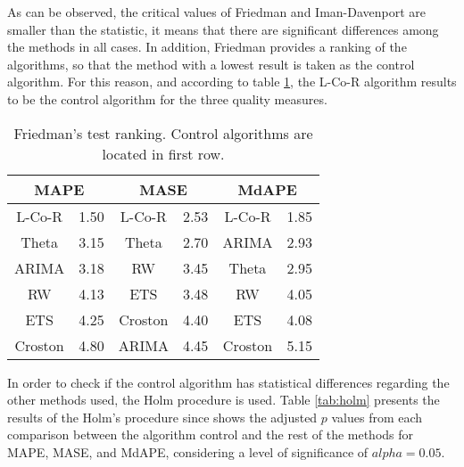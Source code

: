 \documentclass[a4paper,twoside]{article}
\newcommand{\metodo}{L-Co-R}
\begin{document}
    As can be observed, the critical values of Friedman and Iman-Davenport are smaller than the statistic, it means that there are significant differences among the methods in all cases.
    In addition, Friedman provides a ranking of the algorithms, so that the method with a lowest result is taken as the control algorithm. For this reason, and according to table \ref{tab:ranking}, the {\metodo} algorithm results to be the control algorithm for the three quality measures.

    \begin{table}[h]
        \caption{Friedman's test ranking. Control algorithms are located in first row.}
        \label{tab:ranking}
        \centering
        \begin{tabular}{|c|c|c|c|c|c|}
         \hline \multicolumn{2}{|c|}{MAPE}   &  \multicolumn{2}{c|}{MASE}  &   \multicolumn{2}{c|}{MdAPE} \\
         \hline {\metodo} & 1.50   &   {\metodo} & 2.53   &   {\metodo} & 1.85 \\
         \hline Theta	&	3.15   &	Theta   &   2.70   &   ARIMA   &   2.93\\
         \hline ARIMA	&	3.18   &	RW      &   3.45   &   Theta   &   2.95\\
         \hline RW      &   4.13   &   ETS     &   3.48   &   RW      &   4.05\\
         \hline ETS     &   4.25   &   Croston &   4.40   &   ETS     &   4.08\\
         \hline Croston &   4.80   &   ARIMA   &   4.45   &   Croston &   5.15\\
         \hline
        \end{tabular}
    \end{table}

In order to check if the control algorithm has statistical differences regarding the other methods used, the Holm procedure \cite{Holm1979} is used. Table \ref{tab:holm} presents the results of the Holm's procedure since shows the adjusted $p$ values from each comparison between the algorithm control and the rest of the methods for MAPE, MASE, and MdAPE, considering a level of significance of $alpha=0.05$.
\end{document}
